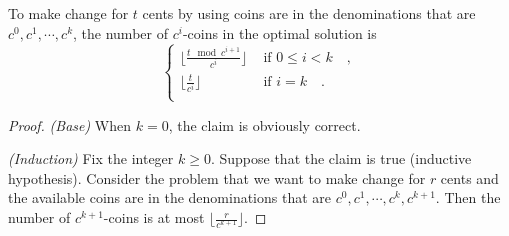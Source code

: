 \begin{claim}
    To make change for $t$ cents by using coins are in the denominations that are $c^0, c^1, \cdots, c^k$, 
    the number of $c^i$-coins in the optimal solution is 
    \begin{equation*}
        \begin{cases}
            \lfloor \frac{t \mod c^{i + 1}}{c^i} \rfloor 
                & \text{ if } 0 \leq i < k \quad , \\
            \lfloor \frac{t}{c^i} \rfloor
                & \text{ if } i = k \quad . \\
            \end{cases}
    \end{equation*}
\end{claim}

\begin{proof}
    \textit{(Base)}
    When $k = 0$, the claim is obviously correct.

    \textit{(Induction)}
    Fix the integer $k \geq 0$.
    Suppose that the claim is true (inductive hypothesis).
    Consider the problem that we want to make change for $r$ cents 
    and the available coins are in the denominations that are 
    $c^0, c^1, \cdots, c^k, c^{k + 1}$.
    Then the number of $c^{k + 1}$-coins is 
    at most $\lfloor \frac{r}{c^{k + 1}} \rfloor$.
    

\end{proof}
